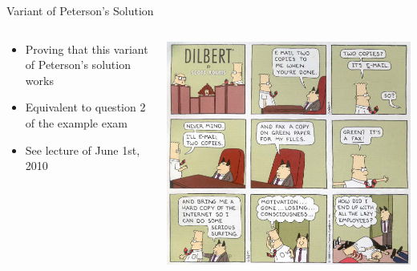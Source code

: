 \begin{frame}{Variant of Peterson's Solution}
  \begin{columns}[c]
    \begin{column}{0.35\textwidth}
      \begin{itemize}
      \item Proving that this variant of Peterson's solution works
      \item Equivalent to question 2 of the example exam
      \item See lecture of June 1st, 2010
      \end{itemize}
    \end{column}
    \begin{column}{0.65\textwidth}
      \begin{center}
        \includegraphics[width=\textwidth]{figures/dilbert}
      \end{center}
    \end{column}
  \end{columns}
\end{frame}



